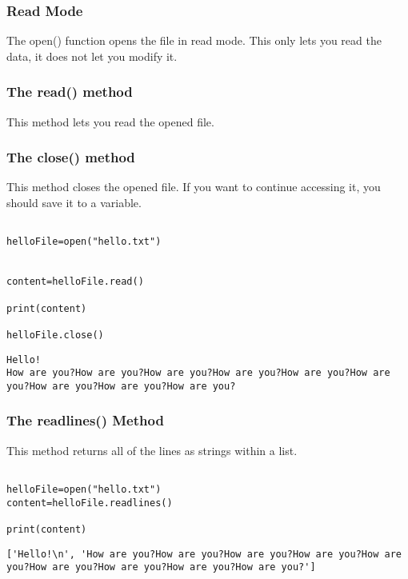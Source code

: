 \documentclass[11pt]{article}
\begin{document}
\subsubsection{Read Mode}
\label{sec:orgada0c51}

The open() function opens the file in read mode. This only lets you read the data, it does not let you modify it.

\subsubsection{The read() method}
\label{sec:orgddb356e}

This method lets you read the opened file.

\subsubsection{The close() method}
\label{sec:org80fb651}

This method closes the opened file. If you want to continue accessing it, you should save it to a variable.

\begin{verbatim}

helloFile=open("hello.txt")


content=helloFile.read()

print(content)

helloFile.close()

\end{verbatim}

\begin{verbatim}
Hello!
How are you?How are you?How are you?How are you?How are you?How are you?How are you?How are you?How are you?
\end{verbatim}

\subsubsection{The readlines() Method}
\label{sec:org7121d86}

This method returns all of the lines as strings within a list.

\begin{verbatim}

helloFile=open("hello.txt")
content=helloFile.readlines()

print(content)

\end{verbatim}

\begin{verbatim}
['Hello!\n', 'How are you?How are you?How are you?How are you?How are you?How are you?How are you?How are you?How are you?']
\end{verbatim}
\end{document}
